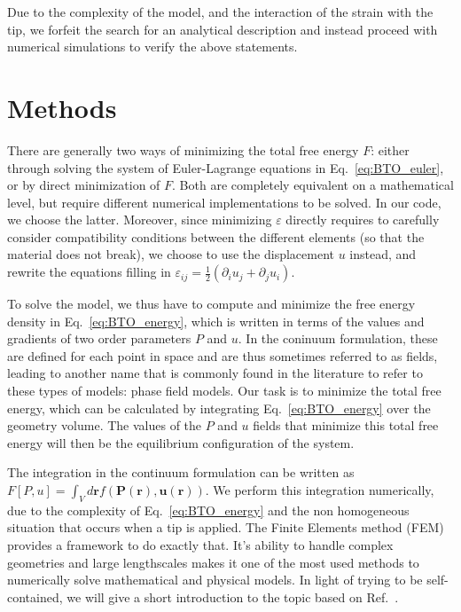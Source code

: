 Due to the complexity of the model, and the interaction of the strain with the tip, we forfeit the search for an analytical description and instead proceed with numerical simulations to verify the above statements.

\section{Methods}
There are generally two ways of minimizing the total free energy $F$: either through solving the system of Euler-Lagrange equations in Eq.~\ref{eq:BTO_euler}, or by direct minimization of $F$.
Both are completely equivalent on a mathematical level, but require different numerical implementations to be solved.
In our code, we choose the latter.
Moreover, since minimizing $\varepsilon$ directly requires to carefully consider compatibility conditions between the different elements (so that the material does not break), we choose to use the displacement $u$ instead, and rewrite the equations filling in $\varepsilon_{ij} = \frac{1}{2}(\partial_i u_j + \partial_j u_i)$.

To solve the model, we thus have to compute and minimize the free energy density in Eq.~\ref{eq:BTO_energy}, which is written in terms of the values and gradients of two order parameters $P$ and $u$.
In the coninuum formulation, these are defined for each point in space and are thus sometimes referred to as fields, leading to another name that is commonly found in the literature to refer to these types of models: phase field models.
Our task is to minimize the total free energy, which can be calculated by integrating Eq.~\ref{eq:BTO_energy} over the geometry volume.
The values of the $P$ and $u$ fields that minimize this total free energy will then be the equilibrium configuration of the system.

The integration in the continuum formulation can be written as $F[P,u]=\int_V d\bm{r} f(\bm{P}(\bm{r}),\bm{u}(\bm{r}))$.
We perform this integration numerically, due to the complexity of Eq.~\ref{eq:BTO_energy} and the non homogeneous situation that occurs when a tip is applied.
The Finite Elements method (FEM) provides a framework to do exactly that.
It's ability to handle complex geometries and large lengthscales makes it one of the most used methods to numerically solve mathematical and physical models.
In light of trying to be self-contained, we will give a short introduction to the topic based on Ref.~\cite{Biner}.

